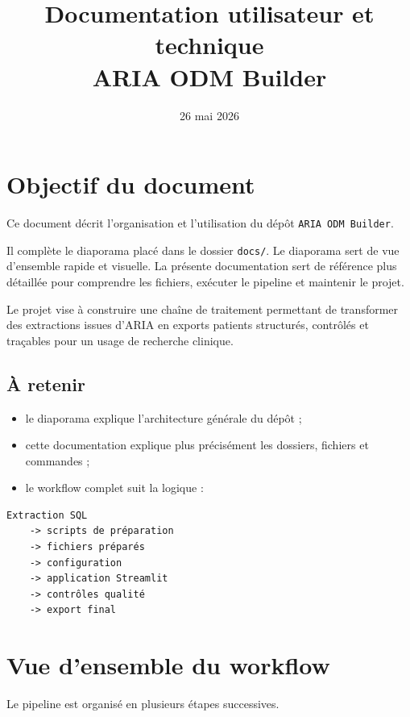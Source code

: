 \documentclass[11pt,a4paper]{article}
\title{\textcolor{TitleBlue}{Documentation utilisateur et technique\\ARIA ODM Builder}}
\author{}
\date{26 mai 2026}
\newcommand{\code}[1]{\texttt{#1}}
\begin{document}
\maketitle
\tableofcontents
\newpage

\section{Objectif du document}

Ce document décrit l'organisation et l'utilisation du dépôt \code{ARIA ODM Builder}.

Il complète le diaporama placé dans le dossier \code{docs/}. Le diaporama sert de vue d'ensemble rapide et visuelle. La présente documentation sert de référence plus détaillée pour comprendre les fichiers, exécuter le pipeline et maintenir le projet.

\medskip

Le projet vise à construire une chaîne de traitement permettant de transformer des extractions issues d'ARIA en exports patients structurés, contrôlés et traçables pour un usage de recherche clinique.

\subsection*{À retenir}

\begin{itemize}
  \item le diaporama explique l'architecture générale du dépôt ;
  \item cette documentation explique plus précisément les dossiers, fichiers et commandes ;
  \item le workflow complet suit la logique :
\end{itemize}

\begin{lstlisting}
Extraction SQL
    -> scripts de préparation
    -> fichiers préparés
    -> configuration
    -> application Streamlit
    -> contrôles qualité
    -> export final
\end{lstlisting}

\section{Vue d'ensemble du workflow}

Le pipeline est organisé en plusieurs étapes successives.
\end{document}
